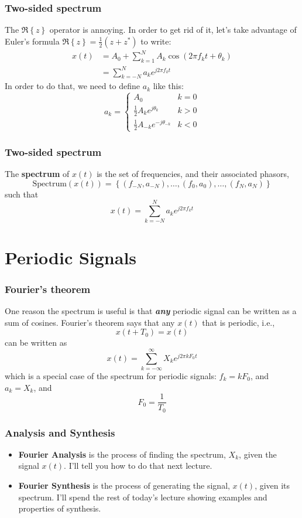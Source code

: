 \documentclass{beamer}
\begin{document}
\begin{frame}
  \frametitle{Two-sided spectrum}

  The $\Re\left\{z\right\}$ operator is annoying.  In order to get rid
  of it, let's take advantage of Euler's formula
  $\Re\left\{z\right\}=\frac{1}{2}(z+z^*)$ to write:
  \begin{align*}
    x(t) &= A_0+ \sum_{k=1}^N A_k\cos\left(2\pi f_kt+\theta_k\right)\\
    &= \sum_{k=-N}^N a_k e^{j2\pi f_k t}    
  \end{align*}
  In order to do that, we need to define $a_k$ like this:
  \[
  a_k = \begin{cases}
    A_0 & k=0\\
    \frac{1}{2}A_ke^{j\theta_k} & k>0\\
    \frac{1}{2}A_{-k}e^{-j\theta_{-k}} & k < 0
  \end{cases}
  \]  
\end{frame}

\begin{frame}
  \frametitle{Two-sided spectrum}

  The {\bf spectrum} of $x(t)$ is the set of frequencies, and their
  associated phasors,
  \[
  \mbox{Spectrum}\left( x(t) \right) =
  \left\{ (f_{-N},a_{-N}), \ldots, (f_0,a_0), \ldots, (f_N,a_N) \right\}
  \]
  such that
  \[
  x(t) = \sum_{k=-N}^N a_ke^{j2\pi f_kt}
  \]
\end{frame}

\section[Periodic]{Periodic Signals}
\setcounter{subsection}{1}

\begin{frame}
  \frametitle{Fourier's theorem}

  One reason the spectrum is useful is that {\bf\em any} periodic
  signal can be written as a sum of cosines.  Fourier's theorem says that
  any $x(t)$ that is periodic, i.e.,
  \[
  x(t+T_0) = x(t)
  \]
  can be written as
  \[
  x(t) = \sum_{k=-\infty}^\infty X_k e^{j2\pi k F_0 t}
  \]
  which is a special case of the spectrum for periodic signals:
  $f_k=kF_0$, and $a_k=X_k$, and
  \[
  F_0 = \frac{1}{T_0}
  \]
\end{frame}

\begin{frame}
  \frametitle{Analysis and Synthesis}

  \begin{itemize}
  \item {\bf Fourier Analysis} is the process of finding the spectrum,
    $X_k$, given the signal $x(t)$.  I'll tell you how to do that next lecture.
  \item {\bf Fourier Synthesis} is the process of generating the
    signal, $x(t)$, given its spectrum.  I'll spend the rest of
    today's lecture showing examples and properties of synthesis.
  \end{itemize}
\end{frame}
\end{document}
